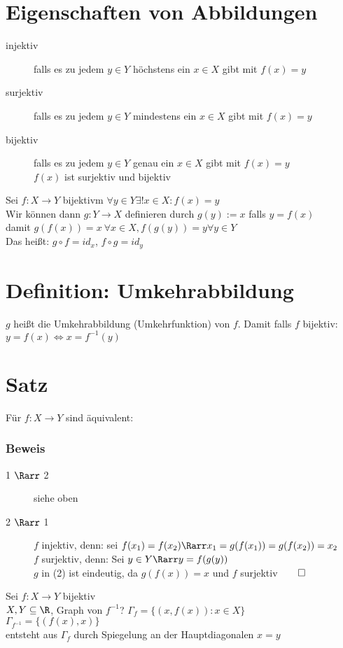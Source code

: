 \section{Eigenschaften von Abbildungen}
\begin{description}
\item[injektiv] falls es zu jedem $y \in Y$ höchstens ein $x \in X$ gibt mit $f(x) = y$
\item[surjektiv] falls es zu jedem $y \in Y$ mindestens ein $x \in X$ gibt mit $f(x) = y$
\item[bijektiv] falls es zu jedem $y \in Y$ genau ein $x \in X$ gibt mit $f(x) = y$\\
$f(x)$ ist surjektiv und bijektiv
\end{description}
Sei $f:X\to Y$ bijektivm $\forall y\in Y \exists! x\in X: f(x) = y$\\
Wir können dann $g: Y\to X$ definieren durch $g(y) := x$ falls $y = f(x)$\\
damit $g(f(x)) = x\ \forall x\in X, f(g(y)) = y \forall y\in Y$\\
Das heißt: $g\circ f = id_x$, $f \circ g = id_y$
\section{Definition: Umkehrabbildung}
$g$ heißt die Umkehrabbildung (Umkehrfunktion) von $f$. 
Damit falls $f$ bijektiv: $y = f(x) \Leftrightarrow x = f^{-1}(y)$
\section{Satz}
Für $f: X\to Y$ sind äquivalent:
\subsubsection*{Beweis}
\begin{description}
\item[1 $\Rarr$ 2] siehe oben
\item[2 $\Rarr$ 1] $f$ injektiv, denn: sei $f(x_1) = f(x_2) \Rarr x_1 = g(f(x_1)) = g(f(x_2)) = x_2$\\
$f$ surjektiv, denn: Sei $y \in Y \Rarr y = f(g(y))$\\
$g$ in (2) ist eindeutig, da $g(f(x)) = x$ und $f$ surjektiv$\qed$
\end{description}
Sei $f:X\to Y$ bijektiv\\
$X, Y \subseteq \R$, Graph von $f^{-1}$?
$\Gamma_f = \{(x, f(x)): x \in X\}$\\
$\Gamma_{f^{-1}} = \{(f(x), x)\}$\\
entsteht aus $\Gamma_f$ durch Spiegelung an der Hauptdiagonalen $x = y$
